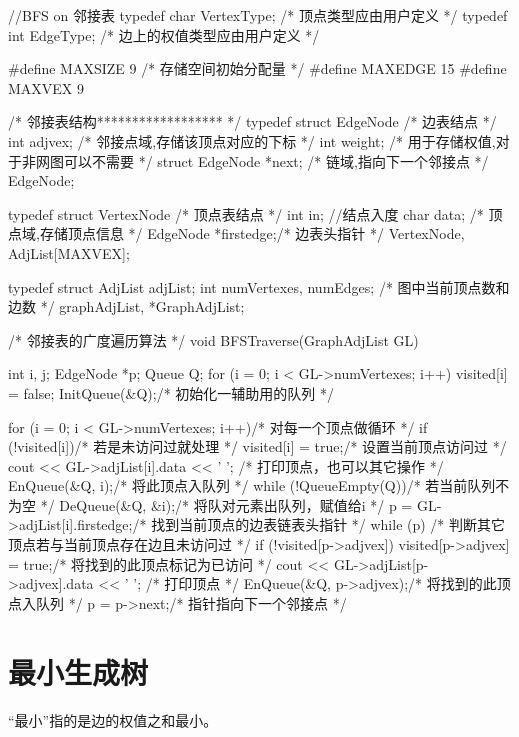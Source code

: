 \begin{Codex}
    //BFS on 邻接表
    typedef char VertexType; /* 顶点类型应由用户定义 */
    typedef int EdgeType; /* 边上的权值类型应由用户定义 */

    #define MAXSIZE 9 /* 存储空间初始分配量 */
    #define MAXEDGE 15
    #define MAXVEX 9

    /* 邻接表结构****************** */
    typedef struct EdgeNode{ /* 边表结点 */
        int adjvex;    /* 邻接点域,存储该顶点对应的下标 */
        int weight;     /* 用于存储权值,对于非网图可以不需要 */
        struct EdgeNode *next; /* 链域,指向下一个邻接点 */
    } EdgeNode;

    typedef struct VertexNode{ /* 顶点表结点 */
        int in; //结点入度
        char data; /* 顶点域,存储顶点信息 */
        EdgeNode *firstedge;/* 边表头指针 */
    } VertexNode, AdjList[MAXVEX];

    typedef struct{
        AdjList adjList;
        int numVertexes, numEdges; /* 图中当前顶点数和边数 */
    } graphAdjList, *GraphAdjList;

    /* 邻接表的广度遍历算法 */
    void BFSTraverse(GraphAdjList GL){
        int i, j;
        EdgeNode *p;
        Queue Q;
        for (i = 0; i < GL->numVertexes; i++)
            visited[i] = false;
        InitQueue(&Q);/* 初始化一辅助用的队列 */

        for (i = 0; i < GL->numVertexes; i++){/* 对每一个顶点做循环 */
            if (!visited[i]){/* 若是未访问过就处理 */
                visited[i] = true;/* 设置当前顶点访问过 */
                cout << GL->adjList[i].data << ' '; /* 打印顶点，也可以其它操作 */
                EnQueue(&Q, i);/* 将此顶点入队列 */
                while (!QueueEmpty(Q)){/* 若当前队列不为空 */
                    DeQueue(&Q, &i);/* 将队对元素出队列，赋值给i */
                    p = GL->adjList[i].firstedge;/* 找到当前顶点的边表链表头指针 */
                    while (p){
                        /* 判断其它顶点若与当前顶点存在边且未访问过  */
                        if (!visited[p->adjvex]){
                            visited[p->adjvex] = true;/* 将找到的此顶点标记为已访问 */
                            cout << GL->adjList[p->adjvex].data << ' '; /* 打印顶点 */
                            EnQueue(&Q, p->adjvex);/* 将找到的此顶点入队列  */
                        }
                        p  = p->next;/* 指针指向下一个邻接点 */
                    }
                }
            }
        }
    }
\end{Codex}

\section{最小生成树} %
“最小”指的是边的权值之和最小。

